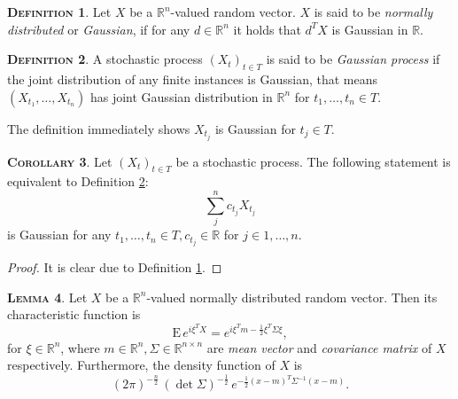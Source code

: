 \documentclass[a4paper, twoside, 11pt]{article}
\theoremstyle{definition}
\newtheorem{definition}{\scshape Definition}[section]
\newtheorem{lemma}[definition]{\scshape Lemma}
\newtheorem{corollary}[definition]{\scshape Corollary}
\begin{document}
  \begin{definition}
	  Let $X$ be a $\mathbb{R}^{n}$-valued random vector. $X$ is said to be \emph{normally distributed} or \emph{Gaussian}, if for any $d \in \mathbb{R}^{n}$ it holds that $d^TX$ is Gaussian in $\mathbb{R}$.
	  \label{sec:g1}
	\end{definition}

	\begin{definition}
	A stochastic process $(X_t)_{t\in T}$ is said to be \emph{Gaussian process} if the joint distribution of any finite instances is Gaussian, that means
  $
  (X_{t_1},\dots, X_{t_n})
  $ has joint Gaussian distribution in $\mathbb{R}^n$ for $t_1,\dots,t_n \in T$.
  \label{sec:defgau}
  \end{definition}
  The definition immediately shows $X_{t_j}$ is Gaussian for $t_j \in T$.

  \begin{corollary}
	Let $(X_t)_{t\in T}$ be a stochastic process. The following statement is \\equivalent to Definition \ref{sec:defgau}:
	\begin{equation*}
	  \sum_j^n c_{t_j} X_{t_j}
	\end{equation*}
	is Gaussian for any $t_1,\dots,t_n \in T, c_{t_j} \in \mathbb{R}$ for $j\in {1,\dots,n}$.
	\label{sec:gauss}
  \end{corollary}
  \begin{proof}
	It is clear due to Definition \ref{sec:g1}.
  \end{proof}

  \begin{lemma}
	Let $X$ be a $\mathbb{R}^{n}$-valued normally distributed random vector. Then its characteristic function is 
	\begin{equation}
	  \mathrm{E}\,e^{i\xi^TX} = e^{i\xi^Tm - \frac{1}{2}\xi^T \Sigma \xi},
	  \label{sec:mcf}
	\end{equation}
   for $\xi \in \mathbb{R}^{n}$, where $m \in \mathbb{R}^{n}, \Sigma \in \mathbb{R}^{n\times n}$ are \emph{mean vector} and \emph{covariance matrix} of $X$ \\respectively. Furthermore, the density function of $X$ is
  \begin{equation}
	(2\pi)^{-\frac{n}{2}}\, (\det\Sigma) ^{-\frac{1}{2}}\,e^{-\frac{1}{2}(x-m)^T\Sigma^{-1}(x-m)}.
	\label{sec:dsy}
  \end{equation}
  \end{lemma}
\end{document}
